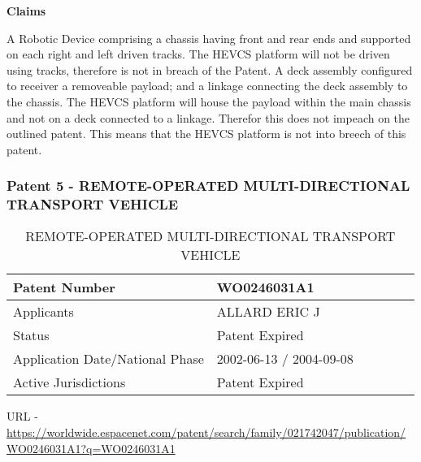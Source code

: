 \documentclass [12pt]{article}
\begin{document}
\textbf{Claims}

A Robotic Device comprising a chassis having front and rear ends and supported on each right and left driven tracks.
The HEVCS platform will not be driven using tracks, therefore is not in breach of the Patent.
A deck assembly configured to receiver a removeable payload; and a linkage connecting the deck assembly to the chassis.
The HEVCS platform will house the payload within the main chassis and not on a deck connected to a linkage. Therefor this does not impeach on the outlined patent.
This means that the HEVCS platform is not into breech of this patent.

\subsubsection{Patent 5 - REMOTE-OPERATED MULTI-DIRECTIONAL TRANSPORT VEHICLE}

\begin{table}[H]
    \centering
    \setlength{\arrayrulewidth}{1.5pt}
    \begin{tabular}{|p{0.5\linewidth}|p{0.5\linewidth}|}
    \hline
    Patent Number & WO0246031A1\\
    \hline
    Applicants & ALLARD ERIC J\\
    \hline
    Status & Patent Expired\\
    \hline
    Application Date/National Phase & 2002-06-13 / 2004-09-08\\
    \hline
    Active Jurisdictions & Patent Expired\\
    \hline
    \end{tabular}
    \caption{REMOTE-OPERATED MULTI-DIRECTIONAL TRANSPORT VEHICLE}
    \label{table:remote_operated_multi_directional_transport_vehicle_patent_information}
\end{table}

URL - \url{https://worldwide.espacenet.com/patent/search/family/021742047/publication/WO0246031A1?q=WO0246031A1}
\end{document}
